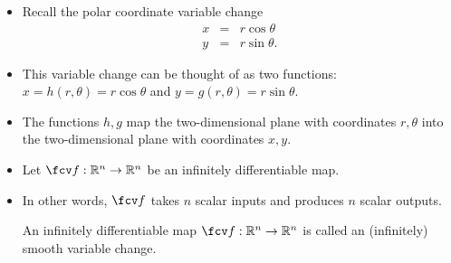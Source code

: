 \begin{frame}
\begin{itemize}
\item Recall the polar coordinate variable change
\[
\begin{array}{rcl}
x&=&r\cos \theta \\
y&=&r\sin \theta.
\end{array}
\]
\item This variable change can be thought of as two functions: $x=h(r, \theta)= r\cos \theta $ and $y=g(r,\theta)=r\sin \theta$.
\item The functions $h,g$ map the two-dimensional plane with coordinates $r,\theta$  into the two-dimensional plane with coordinates $x,y$.
\item Let $\fcv f:\mathbb R^n\to \mathbb R^n$ be an infinitely differentiable map.
\item In other words, $\fcv f$ takes $n$ scalar inputs and produces $n$ scalar outputs.
\begin{definition}
An infinitely differentiable map $\fcv f:\mathbb R^n\to \mathbb R^n$ is called an (infinitely) smooth variable change. 
\end{definition}
\end{itemize}
\end{frame}